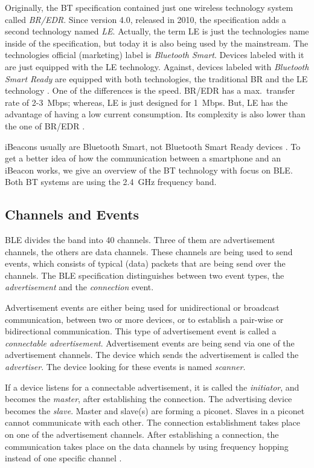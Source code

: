 Originally, the \ac{BT} specification contained just one wireless technology system called \emph{\ac{BR}/\ac{EDR}}. Since version 4.0, released in 2010, the specification adds a second technology named \emph{\ac{LE}}. Actually, the term \ac{LE} is just the technologies name inside of the specification, but today it is also being used by the mainstream. The technologies official (marketing) label is \emph{Bluetooth Smart}. Devices labeled with it are just equipped with the \ac{LE} technology. Against, devices labeled with \emph{Bluetooth Smart Ready} are equipped with both technologies, the traditional \ac{BR} and the \ac{LE} technology \citep{bluetooth:spec}. One of the differences is the speed. \ac{BR}/\ac{EDR} has a max.\ transfer rate of 2-3~Mbps; whereas, \ac{LE} is just designed for 1~Mbps. But, \ac{LE} has the advantage of having a low current consumption. Its complexity is also lower than the one of \ac{BR}/\ac{EDR} \citep{bluetooth:spec}.

iBeacons usually are Bluetooth Smart, not Bluetooth Smart Ready devices \citep{binside:ds}. To get a better idea of how the communication between a smartphone and an iBeacon works, we give an overview of the \acs{BT} technology with focus on \acs{BLE}. Both \ac{BT} systems are using the 2.4~GHz frequency band.


\subsection*{Channels and Events}
\ac{BLE} divides the band into 40 channels. Three of them are advertisement channels, the others are data channels. These channels are being used to send events, which consists of typical (data) packets that are being send over the channels. The \ac{BLE} specification distinguishes between two event types, the \emph{advertisement} and the \emph{connection} event.

Advertisement events are either being used for unidirectional or broadcast communication, between two or more devices, or to establish a pair-wise or bidirectional communication. This type of advertisement event is called a \emph{connectable advertisement}. Advertisement events are being send via one of the advertisement channels. The device which sends the advertisement is called the \emph{advertiser}. The device looking for these events is named \emph{scanner}.

If a device listens for a connectable advertisement, it is called the \emph{initiator}, and becomes the \emph{master}, after establishing the connection. The advertising device becomes the \emph{slave}. Master and slave(s) are forming a piconet. Slaves in a piconet cannot communicate with each other. The connection establishment takes place on one of the advertisement channels. After establishing a connection, the communication takes place on the data channels by using frequency hopping instead of one specific channel \citep{bluetooth:spec}.

